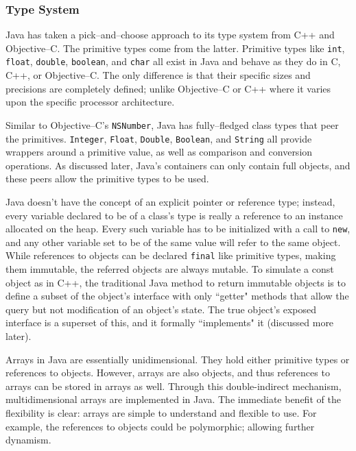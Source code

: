 
\subsubsection{Type System}
  Java has taken a pick--and--choose approach to its type system from C++ and Objective--C.  The primitive types come from the latter.  Primitive types like \texttt{int}, \texttt{float}, \texttt{double}, \texttt{boolean}, and \texttt{char} all exist in Java and behave as they do in C, C++, or Objective--C.  The only difference is that their specific sizes and precisions are completely defined; unlike Objective--C or C++ where it varies upon the specific processor architecture.  

  Similar to Objective--C's \texttt{NSNumber}, Java has fully--fledged class types that peer the primitives.  \texttt{Integer}, \texttt{Float}, \texttt{Double}, \texttt{Boolean}, and \texttt{String} all provide wrappers around a primitive value, as well as comparison and conversion operations.  As discussed later, Java's containers can only contain full objects, and these peers allow the primitive types to be used.  

  Java doesn't have the concept of an explicit pointer or reference type; instead, every variable declared to be of a class's type is really a reference to an instance allocated on the heap.  Every such variable has to be initialized with a call to \texttt{new}, and any other variable set to be of the same value will refer to the same object.  While references to objects can be declared \texttt{final} like primitive types, making them immutable, the referred objects are always mutable.  To simulate a const object as in C++, the traditional Java method to return immutable objects is to define a subset of the object's interface with only ``getter" methods that allow the query but not modification of an object's state.  The true object's exposed interface is a superset of this, and it formally ``implements" it (discussed more later).

  Arrays in Java are essentially unidimensional.  They hold either primitive types or references to objects.  However, arrays are also objects, and thus references to arrays can be stored in arrays as well.  Through this double-indirect mechanism, multidimensional arrays are implemented in Java.  The immediate benefit of the flexibility is clear: arrays are simple to understand and flexible to use.  For example, the references to objects could be polymorphic; allowing further dynamism.


